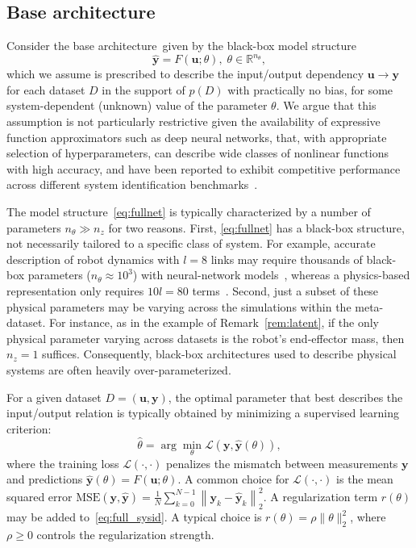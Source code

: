 \documentclass{article}
\newcommand{\base}{{base architecture}}
\newcommand{\norm}[1]{\left\lVert#1\right\rVert}
\newcommand{\seq}[1]{{\mathbf{#1}}}
\newcommand{\R}{\mathbb{R}}
\newcommand{\loss}{\mathcal{L}}
\newcommand{\latent}{z}
\newcommand{\fullpar}{\theta}
\newcommand{\M}{F}
\begin{document}
\subsection{Base architecture}
\label{sec:full_order}
Consider the \base\ given by the black-box model structure
\begin{equation}
\label{eq:fullnet}
\hat {\seq{y}} = \M(\seq{u}; \fullpar),\;  \fullpar \in \R^{n_\fullpar},
\end{equation}
which we assume is prescribed to describe the input/output dependency $\seq u \rightarrow \seq y$ for each dataset $D$ in the support of $p(D)$ with practically no bias, for some system-dependent (unknown) value of the parameter $\fullpar$.
We argue that this assumption is not particularly restrictive given the availability of expressive function approximators such as deep neural networks, that, with appropriate selection of hyperparameters, can describe wide classes of nonlinear functions with high accuracy, and have been reported to exhibit competitive performance across different system identification benchmarks~\cite{champneys2024baseline}.

The model structure~\eqref{eq:fullnet} is typically characterized by a number of parameters $n_\fullpar \gg n_\latent$ for two reasons. First, \eqref{eq:fullnet} has a black-box structure, not necessarily tailored to a specific class of system. For example, accurate description of robot dynamics with $l=8$ links may require thousands of black-box parameters ($n_\fullpar \approx 10^3$) with neural-network models~\cite{Bem25}, whereas a physics-based representation only requires $10l = 80$ terms~\cite{gaz2019dynamic}.
Second, just a subset of these physical parameters may be varying across the simulations within the meta-dataset. For instance, as in the example of Remark~\ref{rem:latent}, if the only physical parameter varying across datasets is the robot's end-effector mass, then $n_\latent=1$ suffices.
Consequently, black-box architectures used to describe physical systems are often heavily over-parameterized.

For a given dataset $D=(\seq{u},\seq{y})$, the optimal parameter that best describes the input/output relation is typically obtained by minimizing a supervised learning criterion:
\begin{equation}
    \label{eq:full_sysid}
    \hat \fullpar = \arg \min_{\fullpar} \loss\left(\seq y, \hat{\seq y}(\fullpar)\right),
\end{equation}
where the training loss $\loss(\cdot, \cdot)$ penalizes the mismatch between measurements $\seq y$ and predictions $\hat{\seq y}(\fullpar)=\M(\seq u; \fullpar)$.
A common choice for $\loss(\cdot, \cdot)$
is the mean squared error $
\mathrm{MSE}(\seq y, \hat {\seq y}) = \frac{1}{N}\sum_{k=0}^{N-1}
\norm{\seq{y}_k -  \hat {\seq{y}}_k}_2^2$. A regularization term $r(\fullpar)$ may be added to~\eqref{eq:full_sysid}. A typical choice is $r(\fullpar)=\rho\|\fullpar\|_2^2$, where $\rho\geq 0$ controls the regularization strength.
\end{document}
